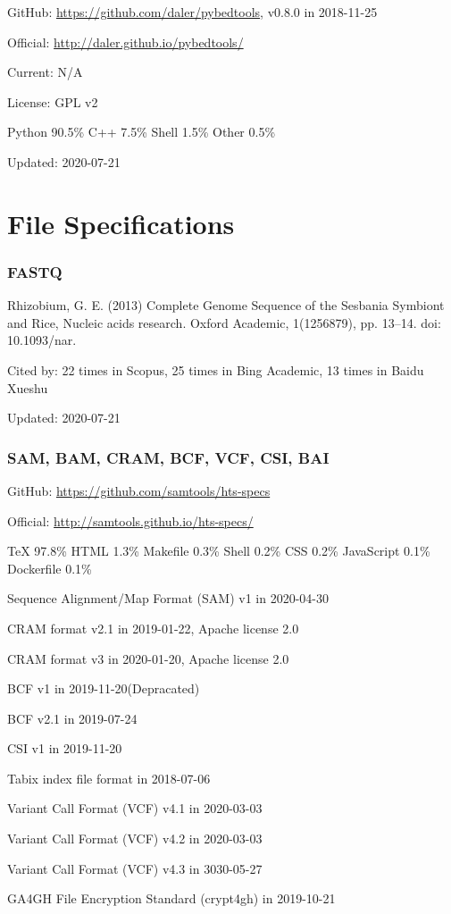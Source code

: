 \documentclass[]{article}
\newcommand{\de}{{\color{red}(Depracated)}}
\newcommand{\cb}[3]{\par Cited by: {\color{blue}\Huge #1} times in Scopus, {\color{blue}\Huge #2} times in Bing Academic, {\color{blue}\Huge #3} times in Baidu Xueshu}
\begin{document}
GitHub: \url{https://github.com/daler/pybedtools}, v0.8.0 in 2018-11-25

Official: \url{http://daler.github.io/pybedtools/}

Current: N/A

License: GPL v2

Python 90.5\% C++ 7.5\% Shell 1.5\% Other 0.5\%

Updated: 2020-07-21

\part{File Specifications}
\section{FASTQ}

Rhizobium, G. E. (2013) Complete Genome Sequence of the Sesbania Symbiont and Rice, Nucleic acids research. Oxford Academic, 1(1256879), pp. 13–14. doi: 10.1093/nar.\cb{22}{25}{13}

Updated: 2020-07-21


\section{SAM, BAM, CRAM, BCF, VCF, CSI, BAI}

GitHub: \url{https://github.com/samtools/hts-specs}

Official: \url{http://samtools.github.io/hts-specs/}

TeX 97.8\% HTML 1.3\% Makefile 0.3\% Shell 0.2\% CSS 0.2\% JavaScript 0.1\% Dockerfile 0.1\% 

Sequence Alignment/Map Format (SAM) v1 in 2020-04-30

CRAM format v2.1 in 2019-01-22, Apache license 2.0

CRAM format v3 in 2020-01-20, Apache license 2.0

BCF v1 in 2019-11-20\de

BCF v2.1 in 2019-07-24

CSI v1 in 2019-11-20

Tabix index file format in 2018-07-06

Variant Call Format (VCF) v4.1 in 2020-03-03

Variant Call Format (VCF) v4.2 in 2020-03-03

Variant Call Format (VCF) v4.3 in 3030-05-27

GA4GH File Encryption Standard (crypt4gh) in 2019-10-21
\end{document}
